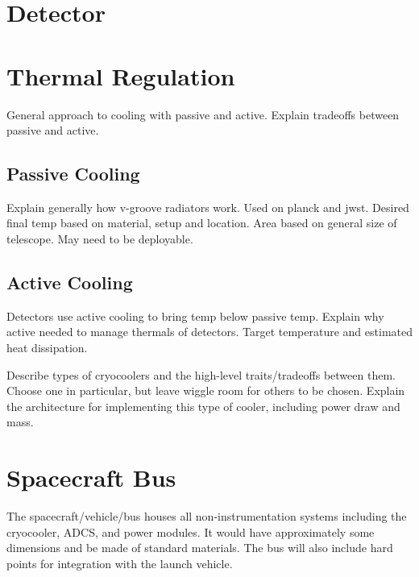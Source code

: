 \documentclass{ws-jai}
\begin{document}
\section{Detector}
\label{S:detector}

%

\section{Thermal Regulation}
\label{S:tempregulation}
General approach to cooling with passive and active. Explain tradeoffs between passive and active.

\subsection{Passive Cooling}
\label{sS:vgrooves}
Explain generally how v-groove radiators work. Used on planck and jwst. Desired final temp based on material, setup and location. Area based on general size of telescope. May need to be deployable.

\subsection{Active Cooling}
\label{sS:cryocooler}
Detectors use active cooling to bring temp below passive temp. Explain why active needed to manage thermals of detectors. Target temperature and estimated heat dissipation.

Describe types of cryocoolers and the high-level traits/tradeoffs between them. Choose one in particular, but leave wiggle room for others to be chosen. Explain the architecture for implementing this type of cooler, including power draw and mass.

\section{Spacecraft Bus}
\label{S:bus}
The spacecraft/vehicle/bus houses all non-instrumentation systems including the cryocooler, ADCS, and power modules. It would have approximately some dimensions and be made of standard materials. The bus will also include hard points for integration with the launch vehicle.
\end{document}

